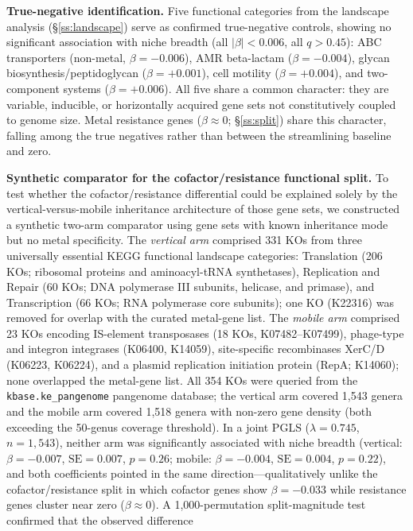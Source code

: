 \documentclass[times]{zHenriquesLab-StyleBioRxiv}
\begin{document}
\textbf{True-negative identification.} Five functional categories from the
landscape analysis (\S\ref{ss:landscape}) serve as confirmed true-negative controls,
showing no significant association with niche breadth (all $|\beta| < 0.006$,
all $q > 0.45$): ABC transporters (non-metal, $\beta = -0.006$), AMR
beta-lactam ($\beta = -0.004$), glycan biosynthesis/peptidoglycan ($\beta =
+0.001$), cell motility ($\beta = +0.004$), and two-component systems ($\beta
= +0.006$). All five share a common character: they are variable, inducible, or
horizontally acquired gene sets not constitutively coupled to genome size. Metal
resistance genes ($\beta \approx 0$; \S\ref{ss:split}) share this character, falling
among the true negatives rather than between the streamlining baseline and zero.

\textbf{Synthetic comparator for the cofactor/resistance functional split.}
To test whether the cofactor/resistance differential could be explained
solely by the vertical-versus-mobile inheritance architecture of those gene sets,
we constructed a synthetic two-arm comparator using gene sets with known
inheritance mode but no metal specificity.
The \emph{vertical arm} comprised 331 KOs from three universally essential
KEGG functional landscape categories: Translation (206 KOs; ribosomal proteins
and aminoacyl-tRNA synthetases), Replication and Repair (60 KOs; DNA polymerase
III subunits, helicase, and primase), and Transcription (66 KOs; RNA polymerase
core subunits); one KO (K22316) was removed for overlap with the curated
metal-gene list.
The \emph{mobile arm} comprised 23 KOs encoding IS-element transposases (18 KOs,
K07482--K07499), phage-type and integron integrases (K06400, K14059),
site-specific recombinases XerC/D (K06223, K06224), and a plasmid replication
initiation protein (RepA; K14060); none overlapped the metal-gene list.
All 354 KOs were queried from the \texttt{kbase.ke\_pangenome} pangenome
database; the vertical arm covered 1,543 genera and the mobile arm covered
1,518 genera with non-zero gene density (both exceeding the 50-genus coverage
threshold).
In a joint PGLS ($\lambda = 0.745$, $n = 1{,}543$), neither arm was
significantly associated with niche breadth (vertical: $\beta = -0.007$,
$\mathrm{SE} = 0.007$, $p = 0.26$; mobile: $\beta = -0.004$,
$\mathrm{SE} = 0.004$, $p = 0.22$), and both coefficients pointed in the
same direction---qualitatively unlike the cofactor/resistance split in which
cofactor genes show $\beta = -0.033$ while resistance genes cluster near zero
($\beta \approx 0$).
A 1,000-permutation split-magnitude test confirmed that the observed difference
\end{document}
